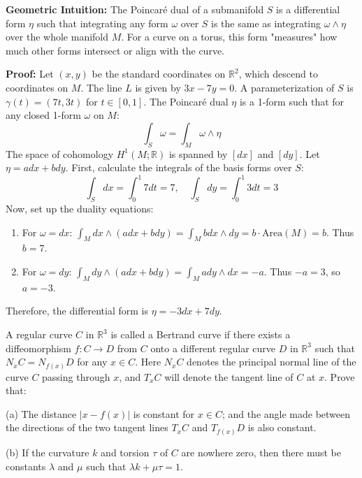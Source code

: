 \begin{solution}
\textbf{Geometric Intuition:} The Poincaré dual of a submanifold $S$ is a differential form $\eta$ such that integrating any form $\omega$ over $S$ is the same as integrating $\omega \wedge \eta$ over the whole manifold $M$. For a curve on a torus, this form "measures" how much other forms intersect or align with the curve.

\textbf{Proof:} Let $(x, y)$ be the standard coordinates on $\mathbb{R}^2$, which descend to coordinates on $M$. The line $L$ is given by $3x - 7y = 0$. A parameterization of $S$ is $\gamma(t) = (7t, 3t)$ for $t \in [0, 1]$.
The Poincaré dual $\eta$ is a 1-form such that for any closed 1-form $\omega$ on $M$:
\[ \int_S \omega = \int_M \omega \wedge \eta \]
The space of cohomology $H^1(M; \mathbb{R})$ is spanned by $[dx]$ and $[dy]$. Let $\eta = a dx + b dy$.
First, calculate the integrals of the basis forms over $S$:
\[ \int_S dx = \int_0^1 7 dt = 7, \quad \int_S dy = \int_0^1 3 dt = 3 \]
Now, set up the duality equations:
\begin{enumerate}
    \item For $\omega = dx$: $\int_M dx \wedge (a dx + b dy) = \int_M b dx \wedge dy = b \cdot \text{Area}(M) = b$. Thus $b = 7$.
    \item For $\omega = dy$: $\int_M dy \wedge (a dx + b dy) = \int_M a dy \wedge dx = -a$. Thus $-a = 3$, so $a = -3$.
\end{enumerate}
Therefore, the differential form is $\eta = -3 dx + 7 dy$.
\end{solution}

\begin{exercise}
\label{geometry:2011:5}
A regular curve $C$ in $\mathbb{R}^{3}$ is called a Bertrand curve if there exists a diffeomorphism $f : C \to D$ from $C$ onto a different regular curve $D$ in $\mathbb{R}^{3}$ such that $N_{x}C = N_{f(x)}D$ for any $x \in C$. Here $N_{x}C$ denotes the principal normal line of the curve $C$ passing through $x$, and $T_{x}C$ will denote the tangent line of $C$ at $x$. Prove that:

(a) The distance $|x - f(x)|$ is constant for $x \in C$; and the angle made between the directions of the two tangent lines $T_{x}C$ and $T_{f(x)}D$ is also constant.

(b) If the curvature $k$ and torsion $\tau$ of $C$ are nowhere zero, then there must be constants $\lambda$ and $\mu$ such that $\lambda k + \mu \tau = 1$.
\end{exercise}

